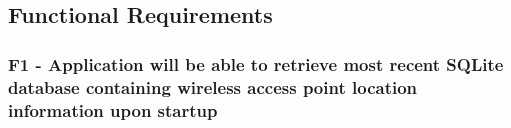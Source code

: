 \documentclass[11pt]{informatics-report}
\begin{document}
\subsection{ Functional Requirements } 

\subsubsection{F1 - Application will be able to retrieve most recent SQLite database containing wireless access point location information upon startup}

%
%
%
%
%
%




\appendix

%
%
\end{document}
